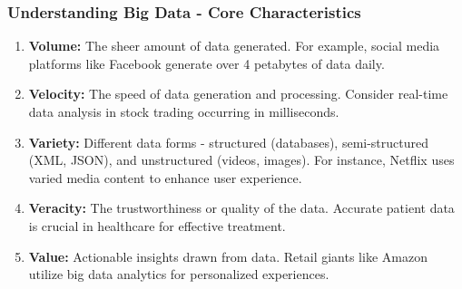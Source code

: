 \documentclass[aspectratio=169]{beamer}
\begin{document}
\begin{frame}[fragile]
    \frametitle{Understanding Big Data - Core Characteristics}
    \begin{enumerate}
        \item \textbf{Volume:} The sheer amount of data generated. For example, social media platforms like Facebook generate over 4 petabytes of data daily.
        
        \item \textbf{Velocity:} The speed of data generation and processing. Consider real-time data analysis in stock trading occurring in milliseconds.
        
        \item \textbf{Variety:} Different data forms - structured (databases), semi-structured (XML, JSON), and unstructured (videos, images). For instance, Netflix uses varied media content to enhance user experience.

        \item \textbf{Veracity:} The trustworthiness or quality of the data. Accurate patient data is crucial in healthcare for effective treatment.

        \item \textbf{Value:} Actionable insights drawn from data. Retail giants like Amazon utilize big data analytics for personalized experiences.
    \end{enumerate}
\end{frame}
\end{document}
